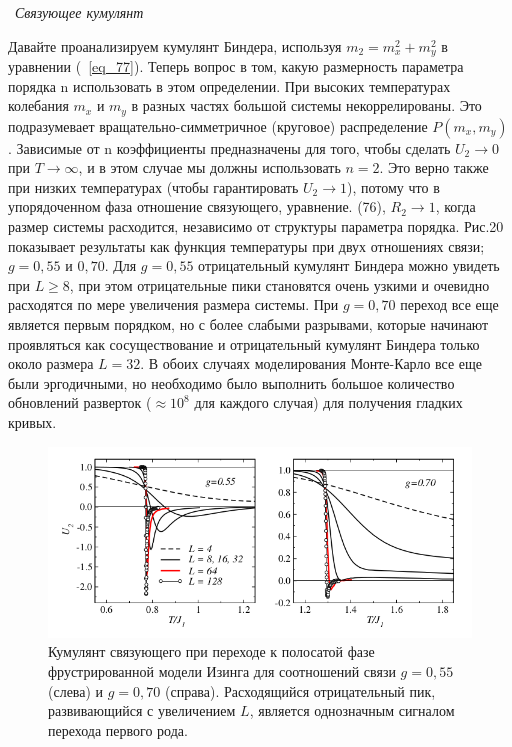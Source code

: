 \documentclass[11pt]{article}
\begin{document}
~\emph{Связующее кумулянт}

Давайте проанализируем кумулянт Биндера, используя $m_2 = m_x^2 + m_y^2$ в уравнении (~\ref{eq_77}). Теперь вопрос в том, какую размерность параметра порядка n использовать в этом определении. При высоких температурах колебания $m_x$ и $m_y$ в разных частях большой системы некоррелированы. Это подразумевает вращательно-симметричное (круговое) распределение $P(m_x, m_y)$. Зависимые от n коэффициенты предназначены для того, чтобы сделать $U_2 → 0$ при $T → ∞$, и в этом случае мы должны использовать $n = 2$. Это верно также при низких температурах (чтобы гарантировать $U_2 → 1$), потому что в упорядоченном фаза отношение связующего, уравнение. (76), $R_2 → 1$, когда размер системы расходится, независимо от структуры параметра порядка. Рис.20 показывает результаты как функция температуры при двух отношениях связи; $g = 0,55$ и $0,70$. Для $g = 0,55$ отрицательный кумулянт Биндера можно увидеть при $L ≥ 8$, при этом отрицательные пики становятся очень узкими и очевидно расходятся по мере увеличения размера системы. При $g = 0,70$ переход все еще является первым порядком, но с более слабыми разрывами, которые начинают проявляться как сосуществование и отрицательный кумулянт Биндера только около размера $L = 32$. В обоих случаях моделирования Монте-Карло все еще были эргодичными, но необходимо было выполнить большое количество обновлений разверток ($\approx 10^8$ для каждого случая) для получения гладких кривых.

\begin{figure}[htp]
\centering
\includegraphics[scale=0.5]{fig20}
\caption{Кумулянт связующего при переходе к полосатой фазе фрустрированной модели Изинга для соотношений связи $g = 0,55$ (слева) и $g = 0,70$ (справа). Расходящийся отрицательный пик, развивающийся с увеличением $L$, является однозначным сигналом перехода первого рода.}
\label{}
\end{figure}
\end{document}

